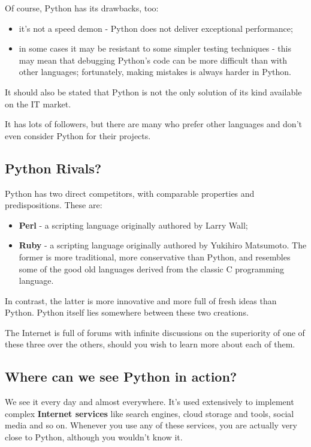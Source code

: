 \documentclass[a4paper,10pt]{article}
\begin{document}
Of course, Python has its drawbacks, too:
\begin{itemize}
 \item it's not a speed demon - Python does not deliver exceptional performance;
 \item in some cases it may be resistant to some simpler testing techniques - this may mean that debugging Python's code can be more difficult than with other languages; fortunately, making mistakes is always harder in Python.
\end{itemize}

It should also be stated that Python is not the only solution of its kind available on the IT market.
\newline

It has lots of followers, but there are many who prefer other languages and don't even consider Python for their projects.

\subsection{Python Rivals?}
Python has two direct competitors, with comparable properties and predispositions. These are:
\begin{itemize}
 \item \textbf{Perl} - a scripting language originally authored by Larry Wall;
 \item \textbf{Ruby} - a scripting language originally authored by Yukihiro Matsumoto.
The former is more traditional, more conservative than Python, and resembles some of the good old languages derived from the classic C programming language.
\end{itemize}

In contrast, the latter is more innovative and more full of fresh ideas than Python. Python itself lies somewhere between these two creations.
\newline

The Internet is full of forums with infinite discussions on the superiority of one of these three over the others, should you wish to learn more about each of them.

\subsection{Where can we see Python in action?}
We see it every day and almost everywhere. It's used extensively to implement complex \textbf{Internet services} like search engines, cloud storage and tools, social media and so on. Whenever you use any of these services, you are actually very close to Python, although you wouldn't know it.
\newline
\end{document}
